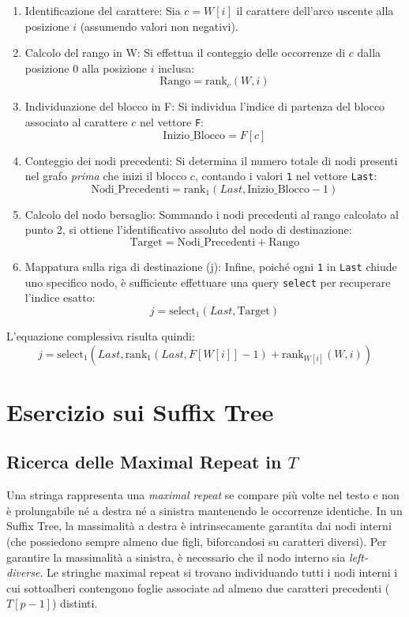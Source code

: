 \documentclass[a4paper,11pt]{article}
\begin{document}
\begin{enumerate}
    \item Identificazione del carattere: Sia $c = W[i]$ il carattere dell'arco uscente alla posizione $i$ (assumendo valori non negativi).
    \item Calcolo del rango in W: Si effettua il conteggio delle occorrenze di $c$ dalla posizione 0 alla posizione $i$ inclusa:
    $$ \text{Rango} = \text{rank}_c(W, i) $$
    \item Individuazione del blocco in F: Si individua l'indice di partenza del blocco associato al carattere $c$ nel vettore \texttt{F}:
    $$ \text{Inizio\_Blocco} = F[c] $$
    \item Conteggio dei nodi precedenti: Si determina il numero totale di nodi presenti nel grafo \textit{prima} che inizi il blocco $c$, contando i valori \texttt{1} nel vettore \texttt{Last}:
    $$ \text{Nodi\_Precedenti} = \text{rank}_1(Last, \text{Inizio\_Blocco} - 1) $$
    \item Calcolo del nodo bersaglio: Sommando i nodi precedenti al rango calcolato al punto 2, si ottiene l'identificativo assoluto del nodo di destinazione:
    $$ \text{Target} = \text{Nodi\_Precedenti} + \text{Rango} $$
    \item Mappatura sulla riga di destinazione (j): Infine, poiché ogni \texttt{1} in \texttt{Last} chiude uno specifico nodo, è sufficiente effettuare una query \texttt{select} per recuperare l'indice esatto:
    $$ j = \text{select}_1(Last, \text{Target}) $$
\end{enumerate}

L'equazione complessiva risulta quindi:
$$ j = \text{select}_1(Last, \text{rank}_1(Last, F[W[i]] - 1) + \text{rank}_{W[i]}(W, i)) $$

\section{Esercizio sui Suffix Tree}

\subsection{Ricerca delle Maximal Repeat in $T$}
Una stringa rappresenta una \textit{maximal repeat} se compare più volte nel testo e non è prolungabile né a destra né a sinistra mantenendo le occorrenze identiche.
In un Suffix Tree, la massimalità a destra è intrinsecamente garantita dai nodi interni (che possiedono sempre almeno due figli, biforcandosi su caratteri diversi).
Per garantire la massimalità a sinistra, è necessario che il nodo interno sia \textit{left-diverse}. Le stringhe maximal repeat si trovano individuando tutti i nodi interni i cui sottoalberi contengono foglie associate ad almeno due caratteri precedenti ($T[p-1]$) distinti.
\end{document}
